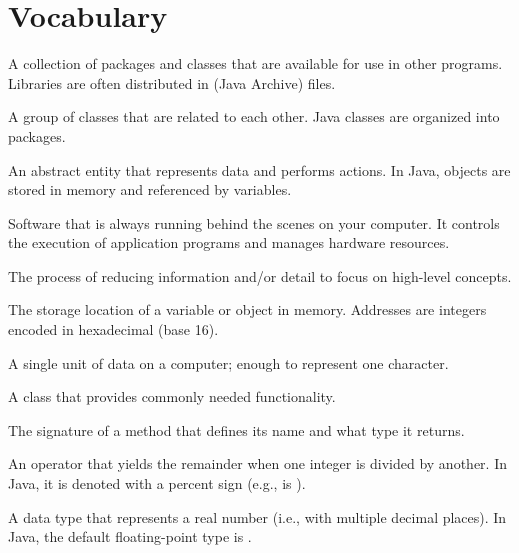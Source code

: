 \section{Vocabulary}

\begin{description}

A collection of packages and classes that are available for use in other programs.
Libraries are often distributed in  (Java Archive) files.

A group of classes that are related to each other.
Java classes are organized into packages.

An abstract entity that represents data and performs actions.
In Java, objects are stored in memory and referenced by variables.

Software that is always running behind the scenes on your computer.
It controls the execution of application programs and manages hardware resources.

The process of reducing information and/or detail to focus on high-level concepts.

The storage location of a variable or object in memory.
Addresses are integers encoded in hexadecimal (base 16).

A single unit of data on a computer; enough to represent one character.

A class that provides commonly needed functionality.


The signature of a method that defines its name and what type it returns.

An operator that yields the remainder when one integer is divided by another.
In Java, it is denoted with a percent sign (e.g.,  is ).

A data type that represents a real number (i.e., with multiple decimal places).
In Java, the default floating-point type is .

\end{description}
